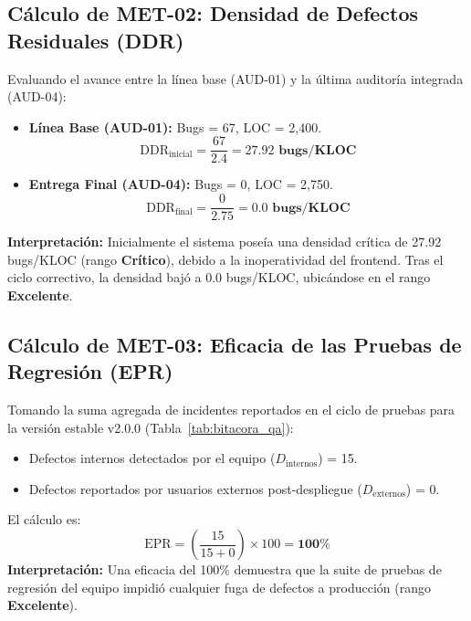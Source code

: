 \documentclass[12pt]{article}
\begin{document}
\subsection{Cálculo de MET-02: Densidad de Defectos Residuales (DDR)}
Evaluando el avance entre la línea base (AUD-01) y la última auditoría integrada (AUD-04):
\begin{itemize}
    \item \textbf{Línea Base (AUD-01):} Bugs = 67, LOC = 2,400.
    \begin{equation}
        \text{DDR}_{\text{inicial}} = \frac{67}{2.4} = \mathbf{27.92\text{ bugs/KLOC}}
    \end{equation}
    \item \textbf{Entrega Final (AUD-04):} Bugs = 0, LOC = 2,750.
    \begin{equation}
        \text{DDR}_{\text{final}} = \frac{0}{2.75} = \mathbf{0.0\text{ bugs/KLOC}}
    \end{equation}
\end{itemize}
\textbf{Interpretación:} Inicialmente el sistema poseía una densidad crítica de 27.92 bugs/KLOC (rango \textcolor{accentred}{\textbf{Crítico}}), debido a la inoperatividad del frontend. Tras el ciclo correctivo, la densidad bajó a 0.0 bugs/KLOC, ubicándose en el rango \textcolor{process}{\textbf{Excelente}}.

\subsection{Cálculo de MET-03: Eficacia de las Pruebas de Regresión (EPR)}
Tomando la suma agregada de incidentes reportados en el ciclo de pruebas para la versión estable v2.0.0 (Tabla~\ref{tab:bitacora_qa}):
\begin{itemize}
    \item Defectos internos detectados por el equipo ($D_{\text{internos}}$) = 15.
    \item Defectos reportados por usuarios externos post-despliegue ($D_{\text{externos}}$) = 0.
\end{itemize}
El cálculo es:
\begin{equation}
    \text{EPR} = \left( \frac{15}{15 + 0} \right) \times 100 = \mathbf{100\%}
\end{equation}
\textbf{Interpretación:} Una eficacia del 100\% demuestra que la suite de pruebas de regresión del equipo impidió cualquier fuga de defectos a producción (rango \textcolor{process}{\textbf{Excelente}}).
\end{document}
